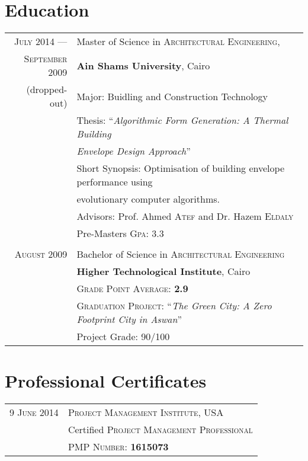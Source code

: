 \documentclass[a4paper,11pt]{article} %
\begin{document}
\section{Education}

\begin{tabular}{r|l}	
\textsc{July} 2014 --- & Master of Science in \textsc{Architectural Engineering},\\ 
\textsc{September} 2009 &\textbf{Ain Shams University}, Cairo\\
\small(dropped-out)& Major: Buidling and Construction Technology\\
& Thesis: ``\emph{Algorithmic Form Generation: A Thermal Building}\\
&\emph{Envelope Design Approach}'' \\
&\small Short Synopsis: Optimisation of building envelope performance using\\
&\small evolutionary computer algorithms.\\
& \small Advisors: Prof. Ahmed \textsc{Atef} and Dr. Hazem \textsc{Eldaly}\\
&\normalsize Pre-Masters \textsc{Gpa}: 3.3\\
\multicolumn{2}{c}{} \\


\textsc{August} 2009& Bachelor of Science in \textsc{Architectural Engineering} \\
& \normalsize\textbf{Higher Technological Institute}, Cairo\\
&\small \textsc{Grade Point Average}: \textbf{2.9} \\
&\small \textsc{Graduation Project:} ``\emph{The Green City: A Zero Footprint City in Aswan}''\\
&\small Project Grade: 90/100\\

\end{tabular}




\section{Professional Certificates}

\begin{tabular}{r|l}
\hspace{9.5mm}\textsc{ 9 June} 2014 & \textsc{Project Management Institute}, USA\\
& Certified \textsc{Project Management Professional}\\
& \textsc{PMP Number:} \textbf{1615073}\\

\end{tabular}
\end{document}
